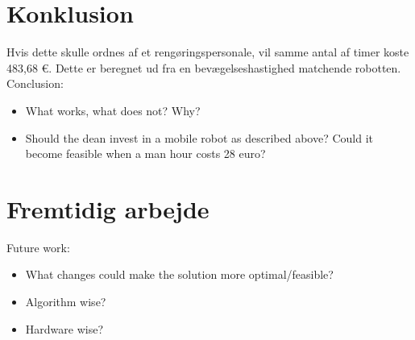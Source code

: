 \section{Konklusion}
\label{sec:kon}
Hvis dette skulle ordnes af et rengøringspersonale, vil samme antal af timer koste 483,68 €. Dette er beregnet ud fra en bevægelseshastighed matchende robotten. \\






Conclusion:
\begin{itemize}
\item What works, what does not? Why?
\item Should the dean invest in a mobile robot as described above? Could it become feasible when a man hour costs 28 euro?
\end{itemize}



\section{Fremtidig arbejde}
\label{sec:frem}



Future work:
\begin{itemize}
\item What changes could make the solution more optimal/feasible?

\item Algorithm wise? 
\item Hardware wise?
\end{itemize}